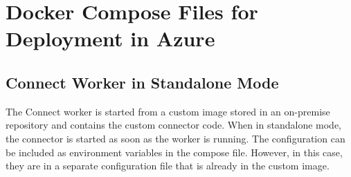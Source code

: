 \section{Docker Compose Files for Deployment in Azure}
\subsection{Connect Worker in Standalone Mode}
The Connect worker is started from a custom image stored in an on-premise repository and contains the custom connector code. When in standalone mode, the connector is started as soon as the worker is running. The configuration can be included as environment variables in the compose file. However, in this case, they are in a separate configuration file that is already in the custom image.
\begin{lstlisting}[frame=tb,caption={Docker Compose file for starting standalone Connect worker},label=lst:dockercomposestandalone]

\end{lstlisting}
\begin{lstlisting}[frame=tb,caption={Connect Worker configuration (distributed mode)},label=lst:connectworkerconfig]

\end{lstlisting}

